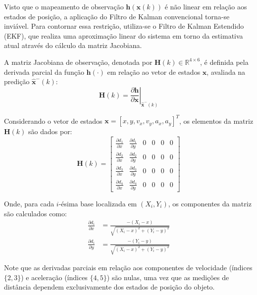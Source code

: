 \documentclass[journal]{IEEEtran}
\begin{document}
Visto que o mapeamento de observação $\mathbf{h}(\mathbf{x}(k))$ é não linear em relação aos estados de posição, a aplicação do Filtro de Kalman convencional torna-se inviável. Para contornar essa restrição, utiliza-se o Filtro de Kalman Estendido (EKF), que realiza uma aproximação linear do sistema em torno da estimativa atual através do cálculo da matriz Jacobiana.

A matriz Jacobiana de observação, denotada por $\mathbf{H}(k) \in \mathbb{R}^{4\times6}$, é definida pela derivada parcial da função $\mathbf{h}(\cdot)$ em relação ao vetor de estados $\mathbf{x}$, avaliada na predição $\hat{\mathbf{x}}^-(k)$:
\begin{equation}
    \mathbf{H}(k) = \left. \frac{\partial \mathbf{h}}{\partial \mathbf{x}} \right|_{\hat{\mathbf{x}}^-(k)}
\end{equation}

Considerando o vetor de estados $\mathbf{x} = [x, y, v_x, v_y, a_x, a_y]^T$, os elementos da matriz $\mathbf{H}(k)$ são dados por:
\begin{equation}
    \mathbf{H}(k) = \begin{bmatrix}
        \frac{\partial d_1}{\partial x} & \frac{\partial d_1}{\partial y} & 0 & 0 & 0 & 0 \\
        \frac{\partial d_2}{\partial x} & \frac{\partial d_2}{\partial y} & 0 & 0 & 0 & 0 \\
        \frac{\partial d_3}{\partial x} & \frac{\partial d_3}{\partial y} & 0 & 0 & 0 & 0 \\
        \frac{\partial d_4}{\partial x} & \frac{\partial d_4}{\partial y} & 0 & 0 & 0 & 0
    \end{bmatrix}
\end{equation}

Onde, para cada $i$-ésima base localizada em $(X_i, Y_i)$, os componentes da matriz são calculados como:
\begin{equation}
\begin{aligned}
    \frac{\partial d_i}{\partial x} &= \frac{-(X_i - x)}{\sqrt{(X_i - x)^2 + (Y_i - y)^2}} \\
    \frac{\partial d_i}{\partial y} &= \frac{-(Y_i - y)}{\sqrt{(X_i - x)^2 + (Y_i - y)^2}}
\end{aligned}
\end{equation}

Note que as derivadas parciais em relação aos componentes de velocidade (índices $\{2, 3\}$) e aceleração (índices $\{4, 5\}$) são nulas, uma vez que as medições de distância dependem exclusivamente dos estados de posição do objeto.
\end{document}
